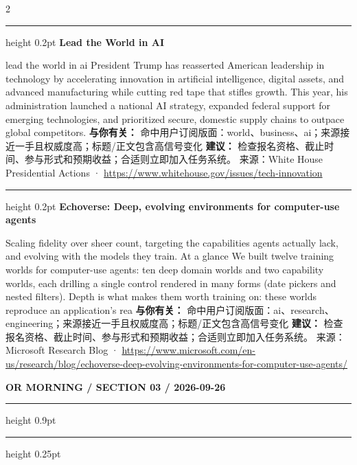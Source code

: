 \documentclass[10.5pt]{ctexart}
\begin{document}
\begin{multicols}{2}
\vspace{2mm}
\hrule height 0.2pt
\vspace{2mm}
{\large\bfseries Lead the World in AI}\par
lead the world in ai President Trump has reasserted American leadership in technology by accelerating innovation in artificial intelligence, digital assets, and advanced manufacturing while cutting red tape that stifles growth. This year, his administration launched a national AI strategy, expanded federal support for emerging technologies, and prioritized secure, domestic supply chains to outpace global competitors.
\textbf{与你有关：} 命中用户订阅版面：world、business、ai；来源接近一手且权威度高；标题/正文包含高信号变化
\textbf{建议：} 检查报名资格、截止时间、参与形式和预期收益；合适则立即加入任务系统。
{\footnotesize\color{ormuted} 来源：White House Presidential Actions · \url{https://www.whitehouse.gov/issues/tech-innovation}}
\vspace{2mm}
\hrule height 0.2pt
\vspace{2mm}
{\large\bfseries Echoverse: Deep, evolving environments for computer-use agents}\par
Scaling fidelity over sheer count, targeting the capabilities agents actually lack, and evolving with the models they train. At a glance We built twelve training worlds for computer-use agents: ten deep domain worlds and two capability worlds, each drilling a single control rendered in many forms (date pickers and nested filters). Depth is what makes them worth training on: these worlds reproduce an application’s rea
\textbf{与你有关：} 命中用户订阅版面：ai、research、engineering；来源接近一手且权威度高；标题/正文包含高信号变化
\textbf{建议：} 检查报名资格、截止时间、参与形式和预期收益；合适则立即加入任务系统。
{\footnotesize\color{ormuted} 来源：Microsoft Research Blog · \url{https://www.microsoft.com/en-us/research/blog/echoverse-deep-evolving-environments-for-computer-use-agents/}}
\end{multicols}
\newpage
{\small\bfseries OR MORNING / SECTION 03 / 2026-09-26}
\vspace{2mm}
\hrule height 0.9pt
\vspace{1.5mm}
\hrule height 0.25pt
\vspace{4mm}
\end{document}
